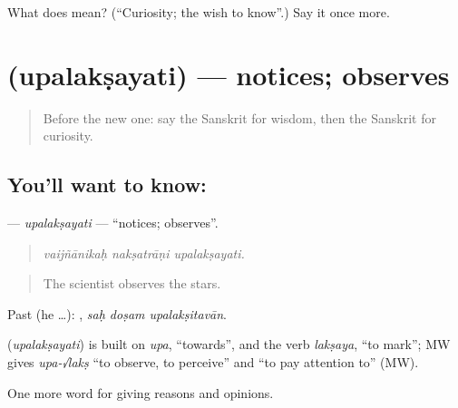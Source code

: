 \begin{tcolorbox}[breakable,colback=teal!4,colframe=teal!35!black,title={Before you move on}]
What does  mean? (\textquotedblleft{}Curiosity; the wish to know\textquotedblright{}.) Say it once more.
\end{tcolorbox}
\section[\texorpdfstring{\sk{उपलक्षयति} (upalakṣayati)}{उपलक्षयति (upalakṣayati)}]{ (upalakṣayati) — notices; observes}

\label{lesson:SA-C365-upalaksayati}



\begin{quote}
Before the new one: say the Sanskrit for wisdom, then the Sanskrit for curiosity.
\end{quote}

\subsection*{You'll want to know: }
\textbf{} — \emph{upalakṣayati} — \textquotedblleft{}notices; observes\textquotedblright{}.

\begin{quote}
  
\end{quote}

\begin{quote}
\emph{vaijñānikaḥ nakṣatrāṇi upalakṣayati.}
\end{quote}

\begin{quote}
The scientist observes the stars.
\end{quote}

Past (he …):   , \emph{saḥ doṣam upalakṣitavān}.

\begin{cousinweb}
\textbf{} (\emph{upalakṣayati}) is built on \emph{upa}, \textquotedblleft{}towards\textquotedblright{}, and the verb \emph{lakṣaya}, \textquotedblleft{}to mark\textquotedblright{}; MW gives \emph{upa-√lakṣ} \textquotedblleft{}to observe, to perceive\textquotedblright{} and \textquotedblleft{}to pay attention to\textquotedblright{} (MW).
\end{cousinweb}

\begin{grammarlens}[title={What you've built}]
One more word for giving reasons and opinions.
\end{grammarlens}

